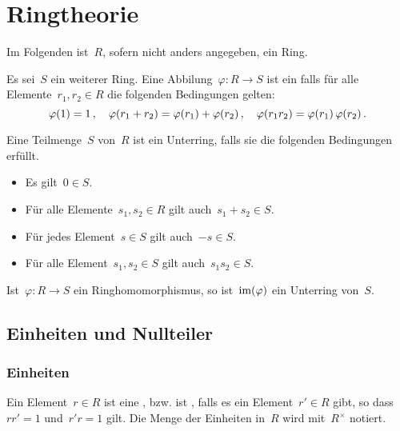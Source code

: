 \chapter{Ringtheorie}


\begin{convention}
  Im Folgenden ist~$R$, sofern nicht anders angegeben, ein Ring.
\end{convention}


\begin{definition}
  Es sei~$S$ ein weiterer Ring.
  Eine Abbilung~$\varphi \colon R \to S$ ist ein  falls für alle Elemente~$r_1, r_2 \in R$ die folgenden Bedingungen gelten:
  \[
    \varphi(1) = 1 \,,
    \quad
    \varphi(r_1 + r_2) = \varphi(r_1) + \varphi(r_2) \,,
    \quad
    \varphi(r_1 r_2) = \varphi(r_1) \, \varphi(r_2) \,.
  \]
\end{definition}

\begin{definition}
  Eine Teilmenge~$S$ von~$R$ ist ein Unterring, falls sie die folgenden Bedingungen erfüllt.
  \begin{itemize}
    \item
      Es gilt~$0 \in S$.
    \item
      Für alle Elemente~$s_1, s_2 \in R$ gilt auch~$s_1 + s_2 \in S$.
    \item
      Für jedes Element~$s \in S$ gilt auch~$-s \in S$.
    \item
      Für alle Element~$s_1, s_2 \in S$ gilt auch~$s_1 s_2 \in S$.
  \end{itemize}
\end{definition}

\begin{example}
  Ist~$\varphi \colon R \to S$ ein Ringhomomorphismus, so ist~$\operatorname{im}(\varphi)$ ein Unterring von~$S$.
\end{example}





\section{Einheiten und Nullteiler}



\subsection{Einheiten}

\begin{definition}
  Ein Element~$r \in R$ ist eine , bzw. ist , falls es ein Element~$r' \in R$ gibt, so dass~$r r' = 1$ und~$r' r = 1$ gilt.
  Die Menge der Einheiten in~$R$ wird mit~$R^\times$ notiert.
\end{definition}


